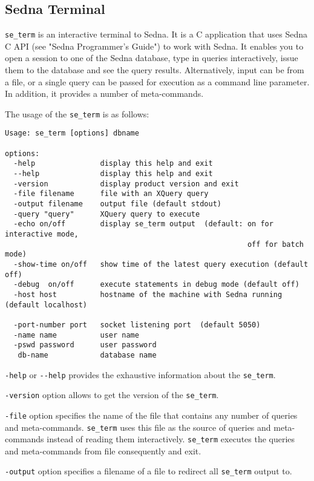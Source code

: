 \documentclass[a4paper,12pt]{article}
\begin{document}
\subsection{Sedna Terminal}
\verb!se_term! is an interactive terminal to Sedna. It is a C application that uses Sedna C API (see "Sedna Programmer's Guide") to work with Sedna. It enables you to open a session to one of the Sedna database, type in queries interactively, issue them to the database and see the query results. Alternatively, input can be from a file, or a single query can be passed for execution as a command line parameter. In addition, it provides a number of meta-commands. 

The usage of the \verb!se_term! is as follows:

\begin{verbatim}
Usage: se_term [options] dbname

options:
  -help			      display this help and exit
  --help		      display this help and exit
  -version		      display product version and exit
  -file filename	  file with an XQuery query			  
  -output filename	  output file (default stdout)
  -query "query"	  XQuery query to execute		
  -echo on/off		  display se_term output  (default: on for interactive mode,
                                                        off for batch mode)
  -show-time on/off	  show time of the latest query execution (default off)
  -debug  on/off      execute statements in debug mode (default off)
  -host host		  hostname of the machine with Sedna running (default localhost)
		
  -port-number port	  socket listening port  (default 5050)
  -name name		  user name 
  -pswd password	  user password 
   db-name		      database name
\end{verbatim}

\verb!-help! or \verb!--help! provides the exhaustive information about the \verb!se_term!.

\verb!-version! option allows to get the version of the \verb!se_term!.

\verb!-file! option specifies the name of the file that contains any number of queries and meta-commands. \verb!se_term! uses this file as the source of queries and meta-commands instead of reading them interactively. \verb!se_term! executes the queries and meta-commands from file consequently and exit.

\verb!-output! option specifies a filename of a file to redirect all \verb!se_term! output to. 
\end{document}

